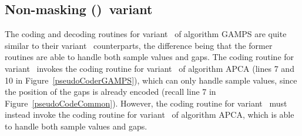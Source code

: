 \clearpage






\subsection{Non-masking (\NOmaskalgo)\ variant}
\label{algo:gamps:nmvariant}


The coding and decoding routines for variant \NOmaskalgo\ of algorithm GAMPS are quite similar to their variant \maskalgo\ counterparts, the difference being that the former routines are able to handle both sample values and gaps. The coding routine for variant \maskalgo\ invokes the coding routine for variant \maskalgo\ of algorithm APCA (lines 7 and 10 in Figure~\ref{pseudoCoderGAMPS}), which can only handle sample values, since the position of the gaps is already encoded (recall line 7 in Figure~\ref{pseudoCodeCommon}). However, the coding routine for variant \NOmaskalgo\ must instead invoke the coding routine for variant \NOmaskalgo\ of algorithm APCA, which is able to handle both sample values and gaps.

